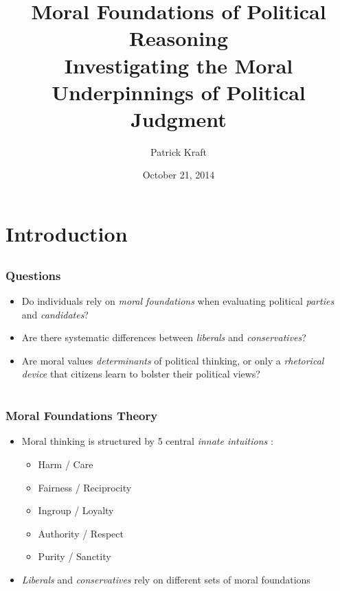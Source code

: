 \documentclass{beamer}
\author[Patrick Kraft]{Patrick Kraft}
\institute[Stony Brook]{Graduate Student Colloquium}
\title[Voter Utilities and Majority Voting]{Moral Foundations of Political Reasoning \\ {\small Investigating the Moral Underpinnings of Political Judgment}}
\date{October 21, 2014}
\begin{document}
\frame{\titlepage}


\section{Introduction}
\subsection{}
\begin{frame}%
  \frametitle{Questions}
  \begin{itemize}
    \item Do individuals rely on \emph{moral foundations} when evaluating political \emph{parties} and \emph{candidates}?
    \item Are there systematic differences between \emph{liberals} and \emph{conservatives}?
    \item Are moral values \emph{determinants} of political thinking, or only a \emph{rhetorical device} that citizens learn to bolster their political views?
  \end{itemize}
\end{frame}

\section{}
\subsection{}
\begin{frame}%
  \frametitle{Moral Foundations Theory}
  \begin{itemize}
    \item Moral thinking is structured by 5 central \emph{innate intuitions} \citep{haidt2008moral}:
    \begin{itemize}
      \item Harm / Care
      \item Fairness / Reciprocity
      \item Ingroup / Loyalty
      \item Authority / Respect
      \item Purity / Sanctity
    \end{itemize}
    \item \emph{Liberals} and \emph{conservatives} rely on different sets of moral foundations \citep[e.g][]{graham2009liberals,haidt2007morality}
  \end{itemize}
\end{frame}
\end{document}
